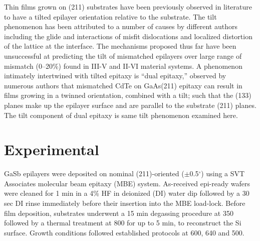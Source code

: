 Thin films grown on (211) substrates have been previously observed in literature to have a tilted epilayer orientation relative to the substrate\cite{Zhao2011,Wang2006,Dhar1997a,Lange1991,Nakamura1992}.
The tilt phenomenon has been attributed to a number of causes by different authors including the glide and interactions of misfit dislocations \cite{Olsen1975,Riesz1994,Ayers1991,Johnson2011} and localized distortion of the lattice at the interface\cite{Sasaki1992}.
The mechanisms proposed thus far have been unsuccessful at predicting the tilt of mismatched epilayers over large range of mismatch (0--20\%) found in III-V and II-VI material systems.
A phenomenon intimately intertwined with tilted epitaxy is ``dual epitaxy,'' observed by numerous authors\cite{Li1995a,Nakamura1992,Rujirawat1998,Lange1991} that mismatched CdTe on GaAs(211) epitaxy can result in films growing in a twinned orientation, combined with a tilt; such that the (133) planes make up the epilayer surface and are parallel to the substrate (211) planes.
The tilt component of dual epitaxy is same tilt phenomenon examined here.

\section{Experimental}
GaSb epilayers were deposited on nominal (211)-oriented (\(\pm\)0.5\(^\circ\)) using a SVT Associates molecular beam epitaxy (MBE) system.
As-received epi-ready wafers were cleaned for 1 min in a 4\% HF in deionized (DI) water dip followed by a 30 sec DI rinse immediately before their insertion into the MBE load-lock.
Before film deposition, substrates underwent a 15 min degassing procedure at 350\celsius{} followed by a thermal treatment at 800\celsius{} for up to 5 min, to reconstruct the Si surface.
Growth conditions followed established protocols\cite{Akahane2004,Balakrishnan2006a,Fischer1986} at 600, 640 and 500\celsius.

